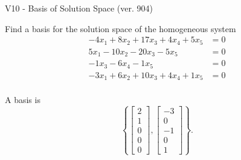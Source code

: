 \begin{exercise}
  \begin{exerciseTitle}V10 - Basis of Solution Space (ver. 904)\end{exerciseTitle}
  \begin{exerciseStatement}
    Find a basis for the solution space of the homogeneous system 
\begin{align*}
 -4 x_ 1 + 8 x_ 2 + 17 x_ 3 + 4 x_ 4 + 5 x_ 5 &= 0  \\ 
  5 x_ 1 -10 x_ 2 -20 x_ 3 -5 x_ 5 &= 0  \\ 
  -1 x_ 3 -6 x_ 4 -1 x_ 5 &= 0  \\ 
  -3 x_ 1 + 6 x_ 2 + 10 x_ 3 + 4 x_ 4 + 1 x_ 5 &= 0  \\ 
 \end{align*}


 
  \end{exerciseStatement}

  \begin{exerciseAnswer}
   A basis is   
\[\left\{\left[\begin{array}{c}
2 \\
1 \\
0 \\
0 \\
0
\end{array}\right] , \left[\begin{array}{c}
-3 \\
0 \\
-1 \\
0 \\
1
\end{array}\right]\right\}.\]

  


  \end{exerciseAnswer}
\end{exercise}